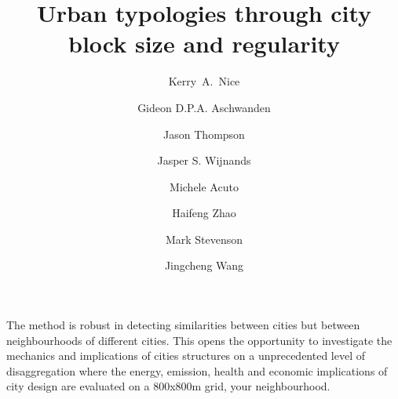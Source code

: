 \documentclass[final,3p,times,authoryear]{elsarticle}
\begin{document}
% 


\begin{frontmatter}



\title{Urban typologies through city block size and regularity}




\author[melb]{Kerry~A.~Nice}
\author[melb]{Gideon D.P.A. Aschwanden}
\author[melb,sun]{Jason Thompson}
\author[melb]{Jasper S. Wijnands}
\author[melb]{Michele Acuto}
\author[melb]{Haifeng Zhao}
\author[melb,pop]{Mark Stevenson}
\author[melb]{Jingcheng Wang}

\address[melb]{Transport, Health, and Urban Design Hub, Faculty of Architecture, Building, and Planning, University of Melbourne, Victoria, Australia}
\address[sun]{Centre for Human Factors and Sociotechnical Systems, University of the Sunshine Coast, Australia}
\address[pop]{Melbourne School of Engineering; and Melbourne School of Population and Global Health, University of Melbourne, Victoria, Australia}

The method is robust in detecting similarities between cities but between neighbourhoods of different cities. This opens the opportunity to investigate the mechanics and implications of cities structures on a unprecedented level of disaggregation where the energy, emission, health and economic implications of city design are evaluated on a 800x800m grid, your neighbourhood.


\begin{abstract}


\end{abstract}
\end{frontmatter}
\end{document}
